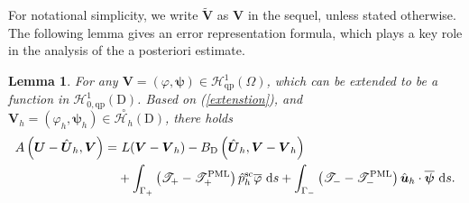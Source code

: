 \documentclass[final,3p,times]{elsarticle}
\newtheorem{lemma}{Lemma}
\begin{document}
For notational simplicity, we write $\tilde{\boldsymbol{V}}$ as  $\boldsymbol{V}$ in the sequel, unless stated otherwise. The following lemma gives an error representation formula, which plays a key role in the analysis of the a posteriori estimate.
\begin{lemma}\label{errorformula}
	For any $\boldsymbol{V}=(\varphi,\boldsymbol{\psi}) \in \mathscr{H}^1_\mathrm{qp}\left(\Omega\right)$, which can be extended to be a function in $\mathscr{H}_{0,\mathrm{qp}}^1\left(\mathrm{D}\right)$. Based on (\ref{extenstion}), and $\boldsymbol{V}_h=(\varphi_h,\boldsymbol{\psi}_h) \in \stackrel{\circ}{\mathscr{H}_h}(\mathrm{D})$, there holds
	\begin{align}\label{lemm6}
		A\left(\boldsymbol{U}-\hat{\boldsymbol{U}}_{h}, \boldsymbol{V}\right)=&~ L(\boldsymbol{V}-\boldsymbol{V}_h)
		-B_\mathrm{D}\left(\hat{\boldsymbol{U}}_h,\boldsymbol{V}-\boldsymbol{V}_h\right) \notag \\
		&+ \int_{\Gamma_+}\left(\mathscr{T}_+-\mathscr{T}_+^{\mathrm{PML}}\right)\hat{p}^{\mathrm{sc}}_h \overline{\varphi} \mathrm{~d} s
		+\int_{\Gamma_-}\left(\mathscr{T}_--\mathscr{T}_-^{\mathrm{PML}}\right)\hat{\boldsymbol{u}}_h \cdot \overline{\boldsymbol{\psi}} \mathrm{~d} s.
	\end{align}
\end{lemma}
\end{document}
